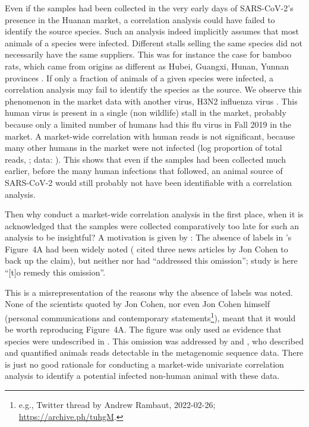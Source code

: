 \documentclass[11pt]{article}
\def \sct {\mbox{SARS-CoV-2}}
\begin{document}
Even if the samples had been collected in the very early days of \sct{}'s presence in the Huanan market, a correlation analysis could have failed to identify the source species. Such an analysis indeed implicitly assumes that most animals of a species were infected. Different stalls selling the same species did not necessarily have the same suppliers. This was for instance the case for bamboo rats, which came from origins as different as Hubei, Guangxi, Hunan, Yunnan provinces \citep[annexes pp.189--191]{WHO2021}. If only a fraction of animals of a given species were infected, a correlation analysis may fail to identify the species as the source. We observe this phenomenon in the market data with another virus, H3N2 influenza virus \citep{ACC2023bioRxiv}. This human virus is present in a single (non wildlife) stall in the market, probably because only a limited number of humans had this flu virus in Fall 2019 in the market. A market-wide correlation with human reads is not significant, because many other humans in the market were not infected (log proportion of total reads, \ACCAllHNHS{}; data: \citet{ACC2023bioRxiv}). This shows that even if the samples had been collected much earlier, before the many human infections that followed, an animal source of \sct{} would still probably not have been identifiable with a correlation analysis. 

Then why conduct a market-wide correlation analysis in the first place, when it is acknowledged that the samples were collected comparatively too late for such an analysis to be insightful? A motivation is given by \citet{Bloom2023VE}: The absence of labels in \citet{Liu2022RS}'s Figure~4A had been widely noted (\citet{Bloom2023VE} cited three news articles by Jon Cohen to back up the claim), but neither \citet{ACC2023Zenodo} nor \citet{Liu2023Nature} had ``addressed this omission''; \citet{Bloom2023VE} study is here ``[t]o remedy this omission''. 

This is a misrepresentation of the reasons why the absence of labels was noted. None of the scientists quoted by Jon Cohen, nor even Jon Cohen himself (personal communications and contemporary statements\footnote{e.g., Twitter thread by Andrew Rambaut, 2022-02-26; \url{https://archive.ph/tuhgM}.}), meant that it would be worth reproducing Figure~4A. The figure was only used as evidence that species were undescribed in \citet{Liu2022RS}. This omission was addressed by \citet{ACC2023Zenodo} and \citet{Liu2023Nature}, who described and quantified animals reads detectable in the metagenomic sequence data. There is just no good rationale for conducting a market-wide univariate correlation analysis to identify a potential infected non-human animal with these data. 
\end{document}
